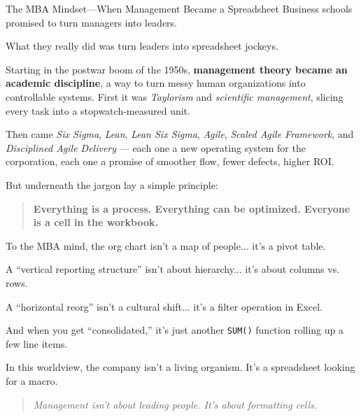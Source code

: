 \begin{HistoricalSidebar}{The MBA Mindset—When Management Became a Spreadsheet}
    Business schools promised to turn managers into leaders.  

    \medskip

    What they really did was turn leaders into spreadsheet jockeys.

    \medskip
    
    Starting in the postwar boom of the 1950s, \textbf{management theory became an academic discipline}, a way to turn messy human organizations into controllable systems. First it was \textit{Taylorism} and \textit{scientific management}, slicing every task into a stopwatch-measured unit. 

    \medskip
    
    Then came \textit{Six Sigma}, \textit{Lean}, \textit{Lean Six Sigma}, \textit{Agile}, \textit{Scaled Agile Framework}, and \textit{Disciplined Agile Delivery} --- each one a new operating system for the corporation, each one a promise of smoother flow, fewer defects, higher ROI.

    \medskip
    
    But underneath the jargon lay a simple principle:  

    \begin{quote}
    \textbf{Everything is a process. Everything can be optimized. Everyone is a cell in the workbook.}
    \end{quote}
    
    To the MBA mind, the org chart isn’t a map of people...  it’s a pivot table.  

    \medskip
    
    A “vertical reporting structure” isn’t about hierarchy... it’s about columns vs. rows.  

    \medskip

    A “horizontal reorg” isn’t a cultural shift... it’s a filter operation in Excel.  

    \medskip

    And when you get “consolidated,” it’s just another \texttt{SUM()} function rolling up a few line items.

    \medskip
    
    In this worldview, the company isn’t a living organism.  It’s a spreadsheet looking for a macro.
    
    \begin{quote}
    \textit{Management isn’t about leading people. It’s about formatting cells.}
    \end{quote}
\end{HistoricalSidebar}

